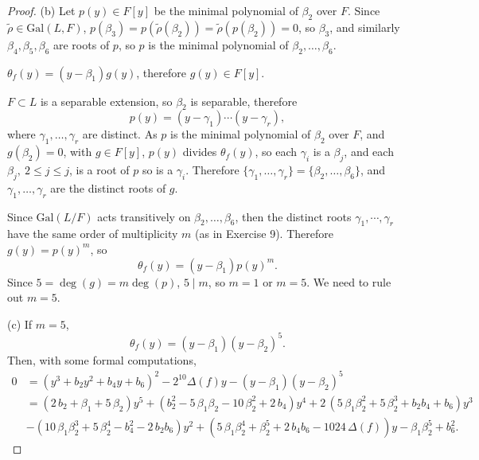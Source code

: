 \documentclass[11pt,a4paper]{article}
\newcommand{\Gal}{\mathrm{Gal}}
\begin{document}
\begin{proof}
\item[(b)] Let $p(y) \in F[y]$ be the minimal polynomial of $\beta_2$ over $F$. Since $\tilde{\rho} \in \Gal(L,F)$, $p(\beta_3) = p(\tilde{\rho}(\beta_2)) =\tilde{\rho}(p(\beta_2)) = 0$, so $\beta_3$, and similarly $\beta_4,\beta_5,\beta_6$ are roots of $p$, so $p$ is the minimal polynomial of $\beta_2,\ldots,\beta_6$.

$\theta_f(y) = (y-\beta_1) g(y)$, therefore $g(y) \in F[y]$.

 $F \subset L$ is a separable extension, so $\beta_2$ is separable, therefore
$$p(y) = (y-\gamma_1)\cdots(y-\gamma_r),$$
where $\gamma_1,\ldots,\gamma_r$ are distinct. As $p$ is the minimal polynomial of $\beta_2$ over $F$, and $g(\beta_2) = 0$, with $g \in F[y]$, $p(y)$ divides $\theta_f(y)$, so each $\gamma_i$ is a $\beta_j$, and each $\beta_j,\ 2 \leq j \leq j$, is a root of $p$ so is a $\gamma_i$. Therefore $\{\gamma_1,\ldots,\gamma_r\} = \{\beta_2,\ldots,\beta_6\}$, and $\gamma_1,\ldots,\gamma_r$ are the distinct roots of $g$.

Since $\Gal(L/F)$ acts transitively on $\beta_2,\ldots,\beta_6$, then the distinct roots $\gamma_1,\cdots,\gamma_r$ have the same order of multiplicity $m$ (as in Exercise 9). Therefore $g(y) = p(y)^m$, so
$$\theta_f(y) = (y-\beta_1)p(y)^m.$$
Since $5 = \deg(g) = m \deg(p)$, $5 \mid m$, so $m=1$ or $m=5$. We need to rule out $m=5$.

\item[(c)] If $m=5$,
$$\theta_f(y) = (y-\beta_1)(y-\beta_2)^5.$$
Then, with some formal computations,
\begin{align*}
0 &= (y^3 + b_2y^2+b_4y +b_6)^2 - 2^{10} \Delta(f) y - (y-\beta_1)(y-\beta_2)^5\\
&=   {\left(2 \, b_{2} + \beta_{1} + 5 \,
\beta_{2}\right)} y^{5} + {\left(b_{2}^{2} - 5 \, \beta_{1} \beta_{2} -
10 \, \beta_{2}^{2} + 2 \, b_{4}\right)} y^{4} + 2 \, {\left(5 \,
\beta_{1} \beta_{2}^{2} + 5 \, \beta_{2}^{3} + b_{2} b_{4} +
b_{6}\right)} y^{3} \\
&- {\left(10 \, \beta_{1} \beta_{2}^{3} + 5 \,
\beta_{2}^{4} - b_{4}^{2} - 2 \, b_{2} b_{6}\right)} y^{2}  +
{\left(5 \, \beta_{1} \beta_{2}^{4} + \beta_{2}^{5} + 2 \, b_{4} b_{6} -
1024 \, \Delta(f) \right)} y -\beta_{1} \beta_{2}^{5} + b_{6}^{2}.
\end{align*}


\end{proof}
\end{document}
